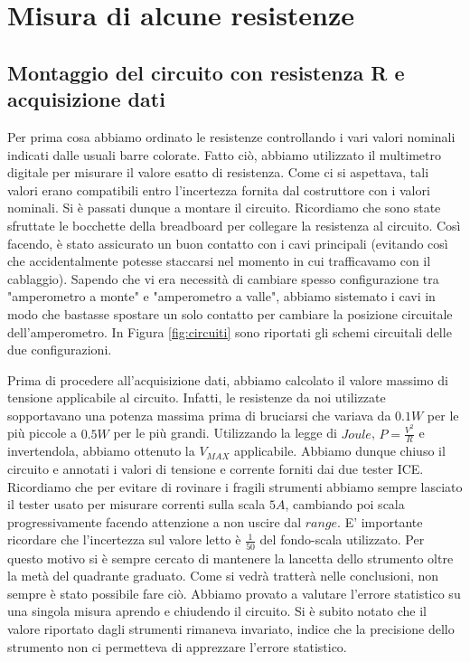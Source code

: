 \section{Misura di alcune resistenze}
\subsection{Montaggio del circuito con resistenza R e acquisizione dati}
Per prima cosa abbiamo ordinato le resistenze controllando i vari valori nominali indicati dalle usuali barre colorate.
Fatto ciò, abbiamo utilizzato il multimetro digitale per misurare il valore esatto di resistenza. Come ci si aspettava, tali valori erano compatibili entro l'incertezza fornita dal costruttore con i valori nominali.
Si è passati dunque a montare il circuito. Ricordiamo che sono state sfruttate le bocchette della breadboard per collegare la resistenza al circuito. Così facendo, è stato assicurato un buon contatto con i cavi principali (evitando così che accidentalmente potesse staccarsi nel momento in cui trafficavamo con il cablaggio).
Sapendo che vi era necessità di cambiare spesso configurazione tra "amperometro a monte" e "amperometro a valle", abbiamo sistemato i cavi in modo che bastasse spostare un solo contatto per cambiare la posizione circuitale dell'amperometro. In Figura \ref{fig:circuiti} sono riportati gli schemi circuitali delle due configurazioni.

Prima di procedere all'acquisizione dati, abbiamo calcolato il valore massimo di tensione applicabile al circuito. Infatti, le resistenze da noi utilizzate sopportavano una potenza massima prima di bruciarsi che variava da $0.1W$ per le più piccole a $0.5W$ per le più grandi. Utilizzando la legge di $Joule$, $P=\frac{V^2}{R}$ e invertendola, abbiamo ottenuto la $V_{MAX}$ applicabile. %
Abbiamo dunque chiuso il circuito e annotati i valori di tensione e corrente forniti dai due tester ICE. Ricordiamo che per evitare di rovinare i fragili strumenti abbiamo sempre lasciato il tester usato per misurare correnti sulla scala $5A$, cambiando poi scala progressivamente facendo attenzione a non uscire dal $range$. E' importante ricordare che l'incertezza sul valore letto è $\frac{1}{50}$ del fondo-scala utilizzato. Per questo motivo si è sempre cercato di mantenere la lancetta dello strumento oltre la metà del quadrante graduato. Come si vedrà tratterà nelle conclusioni, non sempre è stato possibile fare ciò. Abbiamo provato a valutare l'errore statistico su una singola misura aprendo e chiudendo il circuito. Si è subito notato che il valore riportato dagli strumenti rimaneva invariato, indice che la precisione dello strumento non ci permetteva di apprezzare l'errore statistico.

